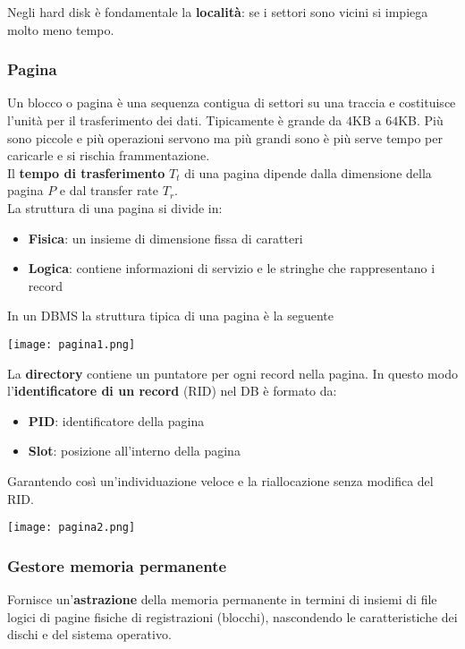 \begin{note}
	Negli hard disk è fondamentale la \textbf{località}: se i settori sono vicini si impiega molto meno tempo.
\end{note}

\subsubsection{Pagina}
Un blocco o pagina è una sequenza contigua di settori su una traccia e costituisce l'unità per il trasferimento dei dati. Tipicamente è grande da $4$KB a $64$KB. Più sono piccole e più operazioni servono ma più grandi sono è più serve tempo per caricarle e si rischia frammentazione.\\
Il \textbf{tempo di trasferimento} $T_t$ di una pagina dipende dalla dimensione della pagina $P$ e dal transfer rate $T_r$.\\
La struttura di una pagina si divide in:
\begin{itemize}
	\item \textbf{Fisica}: un insieme di dimensione fissa di caratteri
	\item \textbf{Logica}: contiene informazioni di servizio e le stringhe che rappresentano i record
\end{itemize}
In un DBMS la struttura tipica di una pagina è la seguente
\begin{center}
	\texttt{[image: pagina1.png]}
\end{center}
La \textbf{directory} contiene un puntatore per ogni record nella pagina. In questo modo l'\textbf{identificatore di un record} (RID) nel DB è formato da:
\begin{itemize}
	\item \textbf{PID}: identificatore della pagina
	\item \textbf{Slot}: posizione all'interno della pagina
\end{itemize}
Garantendo così un'individuazione veloce e la riallocazione senza modifica del RID.
\begin{center}
	\texttt{[image: pagina2.png]}
\end{center}

\subsubsection{Gestore memoria permanente}
Fornisce un’\textbf{astrazione} della memoria permanente in termini di insiemi di file logici di pagine fisiche di registrazioni (blocchi), nascondendo le caratteristiche dei dischi e del sistema operativo.

